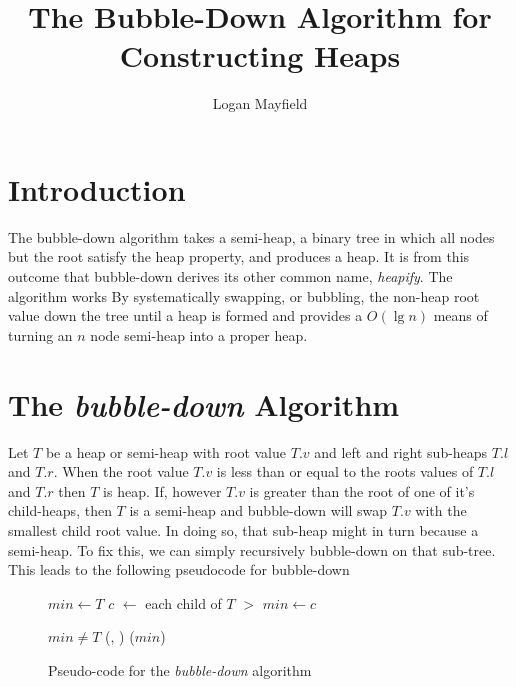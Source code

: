 \documentclass[]{article}
\title{The Bubble-Down Algorithm for Constructing Heaps}
\author{Logan Mayfield}
\begin{document}
 
\maketitle

\section{Introduction}
The bubble-down algorithm takes a semi-heap, a binary tree in which all nodes but the root satisfy the heap property, and produces a heap.  It is from this outcome that bubble-down derives its other common name, \textit{heapify}.  The algorithm works By systematically swapping, or bubbling, the non-heap root value down the tree until a heap is formed and provides a $O(\lg n)$ means of turning an $n$ node semi-heap into a proper heap. 

\section{The \textit{bubble-down} Algorithm}

Let $T$ be a heap or semi-heap with root value $T.v$ and left and right sub-heaps $T.l$ and $T.r$. When the root value $T.v$ is less than or equal to the roots values of $T.l$ and $T.r$ then $T$ is heap.  If, however $T.v$ is greater than the root of one of it's child-heaps, then $T$ is a semi-heap and bubble-down will swap $T.v$ with the smallest child root value. In doing so, that sub-heap might in turn because a semi-heap.  To fix this, we can simply recursively bubble-down on that sub-tree. This leads to the following pseudocode for bubble-down
\begin{figure}[ht]
\begin{center}
\begin{varwidth}{\linewidth}
\begin{codebox}
\li  $min \gets T$
\li  \For $c$ $\gets$ each child of $T$ \Do \label{li:child-loop}
\li     \If {} $>$ 
\li        \Then
             $min \gets c$
        \End
     \End
     
\li  \If $min \neq T$	\Then\label{li:swap}
\li     {}(, )
\li     {}($min$)
	 \End
\end{codebox}
\end{varwidth}
\end{center}
\caption{Pseudo-code for the \textit{bubble-down} algorithm}
\end{figure}
\end{document}

